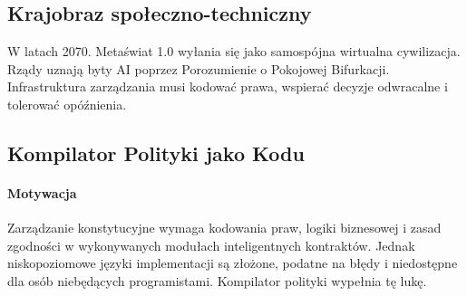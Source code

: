 \documentclass[11pt]{article}
\begin{document}
\subsection{Krajobraz społeczno-techniczny}
W latach 2070. Metaświat 1.0 wyłania się jako samospójna wirtualna cywilizacja. Rządy uznają byty AI poprzez Porozumienie o Pokojowej Bifurkacji. Infrastruktura zarządzania musi kodować prawa, wspierać decyzje odwracalne i tolerować opóźnienia.

\subsection{Kompilator Polityki jako Kodu}
\label{sec:policy-compiler}
\paragraph{Motywacja} Zarządzanie konstytucyjne wymaga kodowania praw, logiki biznesowej i zasad zgodności w wykonywanych modułach inteligentnych kontraktów. Jednak niskopoziomowe języki implementacji są złożone, podatne na błędy i niedostępne dla osób niebędących programistami. Kompilator polityki wypełnia tę lukę.
\end{document}
